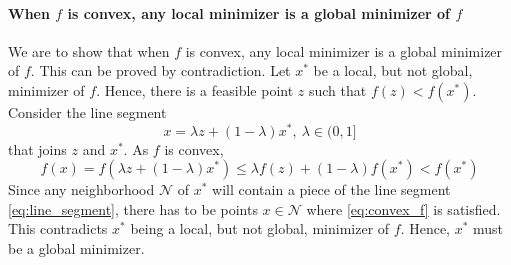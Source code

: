 
\paragraph{When $f$ is convex, any local minimizer is a global minimizer of $f$} We are to show that when $f$ is convex, any local minimizer is a global minimizer of $f$. This can be proved by contradiction. Let $x^*$ be a local, but not global, minimizer of $f$. Hence, there is a feasible point $z$ such that $f(z) < f(x^*)$. Consider the line segment
%
\begin{equation}
\label{eq:line_segment}
    x = \lambda z + (1-\lambda)x^*, \: \lambda \in (0, 1]
\end{equation}
%
that joins $z$ and $x^*$. As $f$ is convex,
%
\begin{equation}
    \label{eq:convex_f}
    f(x) = f(\lambda z + (1 - \lambda)x^*) \leq \lambda f(z) + (1 - \lambda)f(x^*) < f(x^*)
\end{equation}
%
Since any neighborhood $\mathcal{N}$ of $x^*$ will contain a piece of the line segment \cref{eq:line_segment}, there has to be points $x \in \mathcal{N}$ where \cref{eq:convex_f} is satisfied. This contradicts $x^*$ being a local, but not global, minimizer of $f$. Hence, $x^*$ must be a global minimizer.
